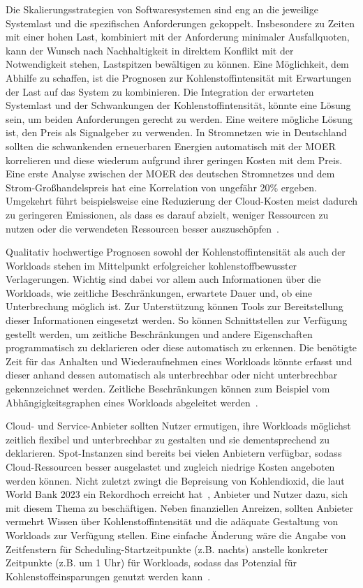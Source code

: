 Die Skalierungsstrategien von Softwaresystemen sind eng an die jeweilige Systemlast und die spezifischen Anforderungen gekoppelt.
Insbesondere zu Zeiten mit einer hohen Last, kombiniert mit der Anforderung minimaler Ausfallquoten, kann der Wunsch nach Nachhaltigkeit in direktem Konflikt mit der Notwendigkeit stehen, Lastspitzen bewältigen zu können.
Eine Möglichkeit, dem Abhilfe zu schaffen, ist die Prognosen zur Kohlenstoffintensität mit Erwartungen der Last auf das System zu kombinieren.
Die Integration der erwarteten Systemlast und der Schwankungen der Kohlenstoffintensität, könnte eine Lösung sein, um beiden Anforderungen gerecht zu werden.
Eine weitere mögliche Lösung ist, den Preis als Signalgeber zu verwenden.
In Stromnetzen wie in Deutschland sollten die schwankenden erneuerbaren Energien automatisch mit der \ac{MOER} korrelieren und diese wiederum aufgrund ihrer geringen Kosten mit dem Preis.
Eine erste Analyse zwischen der \ac{MOER} des deutschen Stromnetzes und dem Strom-Großhandelspreis hat eine Korrelation von ungefähr 20\% ergeben.
Umgekehrt führt beispielsweise eine Reduzierung der Cloud-Kosten meist dadurch zu geringeren Emissionen, als dass es darauf abzielt, weniger Ressourcen zu nutzen oder die verwendeten Ressourcen besser auszuschöpfen~\cite{Thoughtworks.2020}.

Qualitativ hochwertige Prognosen sowohl der Kohlenstoffintensität als auch der Workloads stehen im Mittelpunkt erfolgreicher kohlenstoffbewusster Verlagerungen.
Wichtig sind dabei vor allem auch Informationen über die Workloads, wie zeitliche Beschränkungen, erwartete Dauer und, ob eine Unterbrechung möglich ist.
Zur Unterstützung können Tools zur Bereitstellung dieser Informationen eingesetzt werden.
So können Schnittstellen zur Verfügung gestellt werden, um zeitliche Beschränkungen und andere Eigenschaften programmatisch zu deklarieren oder diese automatisch zu erkennen.
Die benötigte Zeit für das Anhalten und Wiederaufnehmen eines Workloads könnte erfasst und dieser anhand dessen automatisch als unterbrechbar oder nicht unterbrechbar gekennzeichnet werden.
Zeitliche Beschränkungen können zum Beispiel vom Abhängigkeitsgraphen eines Workloads abgeleitet werden~\cite{Wiesner.2021}.

Cloud- und Service-Anbieter sollten Nutzer ermutigen, ihre Workloads möglichst zeitlich flexibel und unterbrechbar zu gestalten und sie dementsprechend zu deklarieren.
Spot-Instanzen sind bereits bei vielen Anbietern verfügbar, sodass Cloud-Ressourcen besser ausgelastet und zugleich niedrige Kosten angeboten werden können.
Nicht zuletzt zwingt die Bepreisung von Kohlendioxid, die laut World Bank 2023 ein Rekordhoch erreicht hat~\cite{WorldBank.2023}, Anbieter und Nutzer dazu, sich mit diesem Thema zu beschäftigen.
Neben finanziellen Anreizen, sollten Anbieter vermehrt Wissen über Kohlenstoffintensität und die adäquate Gestaltung von Workloads zur Verfügung stellen.
Eine einfache Änderung wäre die Angabe von Zeitfenstern für Scheduling-Startzeitpunkte (z.B. nachts) anstelle konkreter Zeitpunkte (z.B. um 1 Uhr) für Workloads, sodass das Potenzial für Kohlenstoffeinsparungen genutzt werden kann~\cite{Wiesner.2021}.

